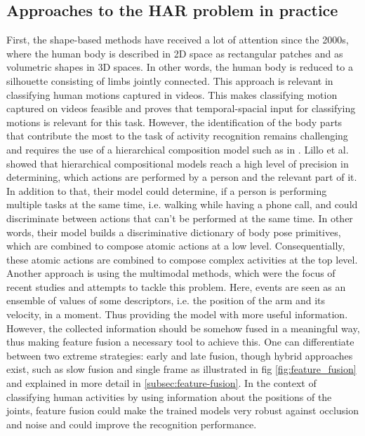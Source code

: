 		\subsection{Approaches to the HAR problem in practice}\label{subsec:approachesHAR}
		First, the shape-based methods have received a lot of attention since the 2000s, where the human body is described in 2D space as rectangular patches and as volumetric shapes in 3D spaces. In other words, the human body is reduced to a silhouette consisting of limbs jointly connected. This approach is relevant in classifying human motions captured in videos\cite{vrigkas2015review}. This makes classifying motion captured on videos feasible and proves that temporal-spacial input for classifying motions is relevant for this task. However, the identification of the body parts that contribute the most to the task of activity recognition remains challenging and requires the use of a hierarchical composition model such as in \cite{lillo2014discriminative}. Lillo et al. showed that hierarchical compositional models reach a high level of precision in determining, which actions are performed by a person and the relevant part of it. In addition to that, their model could determine, if a person is performing multiple tasks at the same time, i.e. walking while having a phone call, and could discriminate between actions that can't be performed at the same time. In other words, their model builds a discriminative dictionary of body pose primitives, which are combined to compose atomic actions at a low level. Consequentially, these atomic actions are combined to compose complex activities at the top level\cite{lillo2014discriminative}.\newline
		Another approach is using the multimodal methods, which were the focus of recent studies and attempts to tackle this problem. Here, events are seen as an ensemble of values of some descriptors, i.e. the position of the arm and its velocity, in a moment. Thus providing the model with more useful information. However, the collected information should be somehow fused in a meaningful way, thus making feature fusion a necessary tool to achieve this. One can differentiate between two extreme strategies: early and late fusion, though hybrid approaches exist, such as slow fusion and single frame as illustrated in fig \ref{fig:feature_fusion} and explained in more detail in \ref{subsec:feature-fusion}. In the context of classifying human activities by using information about the positions of the joints, feature fusion could make the trained models very robust against occlusion and noise and could improve the recognition performance\cite{vrigkas2015review}.
